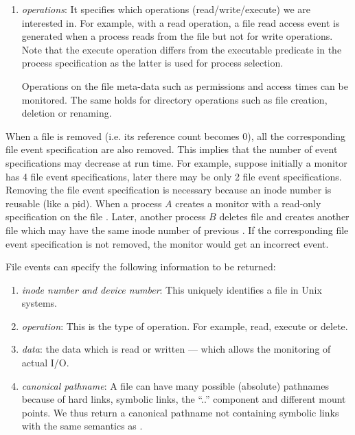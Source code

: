 \begin{enumerate}
\item {\em operations}:
It specifies which operations (read/write/execute) we are interested in.
For example, with a read operation, a file read access event
is generated when a process reads from the file but not for write operations.
Note that the execute operation differs from the executable 
predicate in the process specification as the latter is used for process
selection.

Operations on the file meta-data such as permissions and access times
can be monitored. The same holds for directory operations such as file
creation, deletion or renaming.

\end{enumerate}

When a file is removed (i.e. its reference count becomes 0),
all the corresponding file event specification are also removed.
This implies that the number of event specifications may decrease at run time.
For example, suppose initially a monitor has 4 file event specifications,
later there may be only 2 file event specifications.
Removing the file event specification is necessary
because an inode number is reusable (like a pid).
When a process $A$ creates a monitor with a read-only specification on
the file .
Later, another process $B$ deletes file 
and creates another file 
which may have the same inode number of previous .
If the corresponding file event specification is not removed, the monitor
would get an incorrect event.

File events can specify the following information to be returned:
\begin{enumerate}
\item {\em inode number and device number}:
This uniquely identifies a file in Unix systems.

\item {\em operation}:
This is the type of operation. For example, read, execute or delete.

\item {\em data}:
the data which is read or written --- which allows the monitoring of actual
I/O.

\item {\em canonical pathname}:
A file can have many possible (absolute) pathnames because of hard links,
symbolic links, the ``..'' component and different mount points.
We thus return a canonical pathname 
not containing symbolic links with
the same semantics as .
\end{enumerate}


